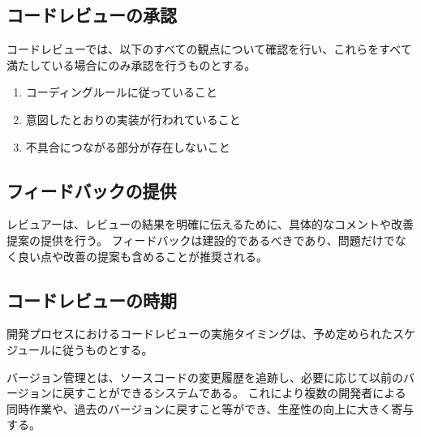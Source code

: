 \subsection{コードレビューの承認}
コードレビューでは、以下のすべての観点について確認を行い、これらをすべて満たしている場合にのみ承認を行うものとする。
\begin{enumerate}
\item コーディングルールに従っていること
\item 意図したとおりの実装が行われていること
\item 不具合につながる部分が存在しないこと
\end{enumerate}

\subsection{フィードバックの提供}
レビュアーは、レビューの結果を明確に伝えるために、具体的なコメントや改善提案の提供を行う。
フィードバックは建設的であるべきであり、問題だけでなく良い点や改善の提案も含めることが推奨される。

\subsection{コードレビューの時期}
開発プロセスにおけるコードレビューの実施タイミングは、予め定められたスケジュールに従うものとする。


\clearpage
バージョン管理とは、ソースコードの変更履歴を追跡し、必要に応じて以前のバージョンに戻すことができるシステムである。
これにより複数の開発者による同時作業や、過去のバージョンに戻すこと等ができ、生産性の向上に大きく寄与する。

